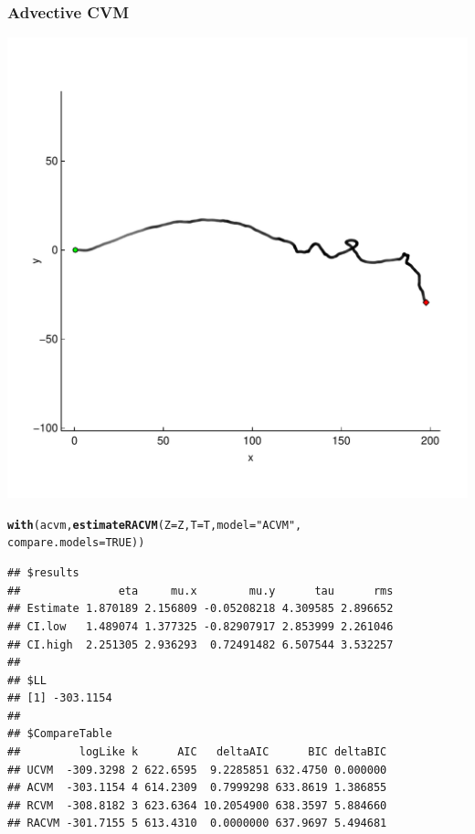 \documentclass[10pt]{article}\usepackage[]{graphicx}\usepackage[]{color}
\makeatletter
\def\maxwidth{ %
  \ifdim\Gin@nat@width>\linewidth
    \linewidth
  \else
    \Gin@nat@width
  \fi
}
\newcommand{\hlnum}[1]{\textcolor[rgb]{0.686,0.059,0.569}{#1}}%
\newcommand{\hlstr}[1]{\textcolor[rgb]{0.192,0.494,0.8}{#1}}%
\newcommand{\hlstd}[1]{\textcolor[rgb]{0.345,0.345,0.345}{#1}}%
\newcommand{\hlkwc}[1]{\textcolor[rgb]{0.333,0.667,0.333}{#1}}%
\newcommand{\hlkwd}[1]{\textcolor[rgb]{0.737,0.353,0.396}{\textbf{#1}}}%
\newenvironment{kframe}{%
 \def\at@end@of@kframe{}%
 \ifinner\ifhmode%
  \def\at@end@of@kframe{\end{minipage}}%
  \begin{minipage}{\columnwidth}%
 \fi\fi%
 \def\FrameCommand##1{\hskip\@totalleftmargin \hskip-\fboxsep
 \colorbox{shadecolor}{##1}\hskip-\fboxsep
     \hskip-\linewidth \hskip-\@totalleftmargin \hskip\columnwidth}%
 \MakeFramed {\advance\hsize-\width
   \@totalleftmargin\z@ \linewidth\hsize
   \@setminipage}}%
 {\par\unskip\endMakeFramed%
 \at@end@of@kframe}
\newenvironment{knitrout}{}{} %
\makeatother
\begin{document}
\subsubsection{Advective CVM}
\begin{minipage}{0.4\linewidth}   
\begin{knitrout}
\color{fgcolor}
\includegraphics[width=\maxwidth]{figure/acvm-1} 

\end{knitrout}
  \end{minipage}
  \begin{minipage}{0.6\linewidth}
\begin{knitrout}\small
{}\color{fgcolor}\begin{kframe}
\begin{alltt}
\hlkwd{with}\hlstd{(acvm,} \hlkwd{estimateRACVM}\hlstd{(}\hlkwc{Z}\hlstd{=Z,} \hlkwc{T}\hlstd{=T,} \hlkwc{model} \hlstd{=} \hlstr{"ACVM"}\hlstd{,}
                         \hlkwc{compare.models}\hlstd{=}\hlnum{TRUE}\hlstd{))}
\end{alltt}
\begin{verbatim}
## $results
##               eta     mu.x        mu.y      tau      rms
## Estimate 1.870189 2.156809 -0.05208218 4.309585 2.896652
## CI.low   1.489074 1.377325 -0.82907917 2.853999 2.261046
## CI.high  2.251305 2.936293  0.72491482 6.507544 3.532257
## 
## $LL
## [1] -303.1154
## 
## $CompareTable
##         logLike k      AIC   deltaAIC      BIC deltaBIC
## UCVM  -309.3298 2 622.6595  9.2285851 632.4750 0.000000
## ACVM  -303.1154 4 614.2309  0.7999298 633.8619 1.386855
## RCVM  -308.8182 3 623.6364 10.2054900 638.3597 5.884660
## RACVM -301.7155 5 613.4310  0.0000000 637.9697 5.494681
\end{verbatim}
\end{kframe}
\end{knitrout}
  \end{minipage}
\end{document}
